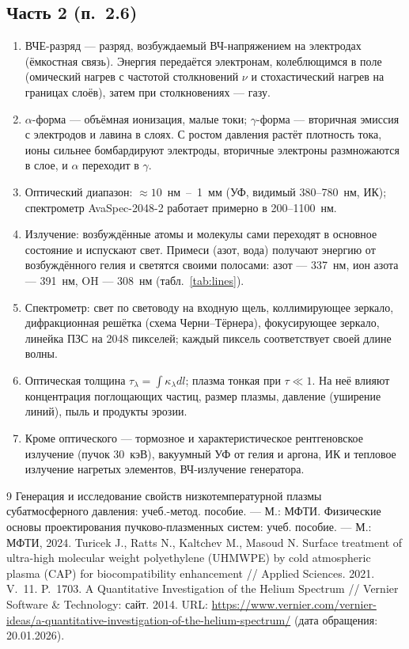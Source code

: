 \documentclass[12pt,a4paper]{article}
\begin{document}
\subsection*{Часть 2 (п.~2.6)}
\begin{enumerate}
  \item ВЧЕ-разряд --- разряд, возбуждаемый ВЧ-напряжением на электродах
        (ёмкостная связь). Энергия передаётся электронам, колеблющимся в
        поле (омический нагрев с частотой столкновений $\nu$ и
        стохастический нагрев на границах слоёв), затем при столкновениях
        --- газу.
  \item $\alpha$-форма --- объёмная ионизация, малые токи; $\gamma$-форма
        --- вторичная эмиссия с электродов и лавина в слоях. С ростом
        давления растёт плотность тока, ионы сильнее бомбардируют
        электроды, вторичные электроны размножаются в слое, и $\alpha$
        переходит в $\gamma$.
  \item Оптический диапазон: $\approx 10$~нм~--~1~мм (УФ, видимый
        380--780~нм, ИК); спектрометр AvaSpec-2048-2 работает примерно
        в 200--1100~нм.
  \item Излучение: возбуждённые атомы и молекулы сами переходят в
        основное состояние и испускают свет. Примеси (азот, вода)
        получают энергию от возбуждённого гелия и светятся своими
        полосами: азот --- 337~нм, ион азота --- 391~нм, OH --- 308~нм
        (табл.~\ref{tab:lines}).
  \item Спектрометр: свет по световоду на входную щель, коллимирующее
        зеркало, дифракционная решётка (схема Черни--Тёрнера),
        фокусирующее зеркало, линейка ПЗС на 2048 пикселей; каждый
        пиксель соответствует своей длине волны.
  \item Оптическая толщина $\tau_\lambda = \int\kappa_\lambda dl$; плазма
        тонкая при $\tau\ll1$. На неё влияют концентрация поглощающих
        частиц, размер
        плазмы, давление (уширение линий), пыль и продукты эрозии.
  \item Кроме оптического --- тормозное и характеристическое рентгеновское
        излучение (пучок 30~кэВ), вакуумный УФ от гелия и аргона, ИК и тепловое излучение нагретых элементов,
        ВЧ-излучение генератора.
\end{enumerate}

\begin{thebibliography}{9}
 Генерация и исследование свойств низкотемпературной плазмы
  субатмосферного давления: учеб.-метод. пособие. --- М.: МФТИ.
 Физические основы проектирования пучково-плазменных систем:
  учеб. пособие. --- М.: МФТИ, 2024.
 Turicek J., Ratts N., Kaltchev M., Masoud N. Surface
  treatment of ultra-high molecular weight polyethylene (UHMWPE) by cold
  atmospheric plasma (CAP) for biocompatibility enhancement // Applied
  Sciences. 2021. V.~11. P.~1703.
 A Quantitative Investigation of the Helium Spectrum //
  Vernier Software \& Technology: сайт. 2014. URL:
  \url{https://www.vernier.com/vernier-ideas/a-quantitative-investigation-of-the-helium-spectrum/}
  (дата обращения: 20.01.2026).
\end{thebibliography}
\end{document}
